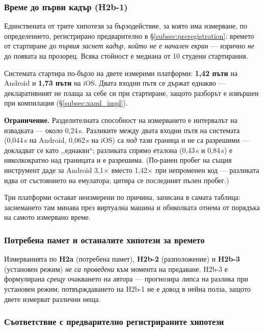 \subsubsection{Време до първи кадър (H2b-1)}

Единствената от трите хипотези за бързодействие, за която има измерване, по определението,
регистрирано предварително в §\ref{subsec:preregistration}: времето от стартиране до \emph{първия
заснет кадър, който не е начален екран} --- изрично \emph{не} до появата на прозорец. Всяка стойност
е медиана от 10 студени стартирания.



Системата стартира по-бързо на двете измерими платформи: \textbf{1,42 пъти} на Android и
\textbf{1,73 пъти} на iOS. Двата входни пътя се държат еднакво --- декларативният не плаща за себе
си при стартиране, защото разборът е извършен при компилация (§\ref{subsec:xaml_impl}).

\textbf{Ограничение.} Разделителната способност на измерването е интервалът на извадката ---
около 0,24\,s. Разликите между двата входни пътя на системата (0,044\,s на Android, 0,062\,s на
iOS) са \emph{под} тази граница и не са разрешими --- докладват се като ,,еднакви“; разликата
спрямо еталона (0,43\,s и 0,84\,s) е няколкократно над границата и е разрешима. (По-ранен пробег на
същия инструмент даде за Android 3,1$\times$ вместо 1,42$\times$ при непроменен код --- разликата
идва от състоянието на емулатора; цитира се последният пълен пробег.)

Три платформи остават неизмерени по причина, записана в самата таблица: заснемането там минава през
виртуална машина и обиколката отнема от порядъка на самото измервано време.

\subsubsection{Потребена памет и останалите хипотези за времето}

Измерванията по \textbf{H2a} (потребена памет), \textbf{H2b-2} (разположение) и \textbf{H2b-3}
(установен режим) \emph{не са проведени} към момента на предаване. H2b-3 е формулирана \emph{срещу}
очакването на автора --- прогнозира липса на разлика при установен режим; потвърждаването на
H2b-1 не е довод в нейна полза, защото двете измерват различни неща.

\subsubsection{Съответствие с предварително регистрираните хипотези}

